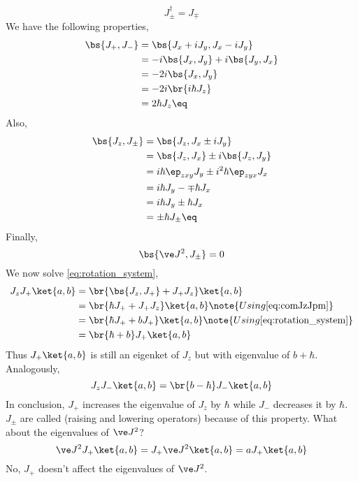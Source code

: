 \documentclass{article}
\begin{document}
\[ J_{\pm}^{\dagger} = J_{\mp} \]
We have the following properties,
\begin{align*}
    \bs{J_+, J_-}
    &= \bs{J_x + i J_y, J_x - i J_y} \\
    &= -i\bs{J_x, J_y} +i\bs{J_y, J_x} \\
    &= -2i\bs{J_x, J_y} \\
    &= -2i\br{i \hbar J_z} \\
    &= 2\hbar J_z \eq \label{eq:comJpJm}
\end{align*}
Also,
\begin{align*}
    \bs{J_z, J_{\pm}}
    &= \bs{J_z, J_x \pm i J_y} \\
    &= \bs{J_z, J_x} \pm i \bs{J_z, J_y} \\
    &= i \hbar \ep_{zxy} J_y \pm i^2 \hbar \ep_{zyx} J_x \\
    &= i \hbar J_y - \mp \hbar J_x \\
    &= i \hbar J_y \pm \hbar J_x \\
    &= \pm \hbar J_{\pm} \eq \label{eq:comJzJpm}
\end{align*}
Finally,
\[ \bs{\ve J^2, J_{\pm}} = 0 \]
We now solve \cref{eq:rotation_system},
\begin{align*}
    J_z J_+ \ket{a,b}
    &= \br{\bs{J_z, J_+} + J_+ J_z} \ket{a,b} \\
    &= \br{\hbar J_+ + J_+ J_z} \ket{a,b} \note{Using \cref{eq:comJzJpm}}\\
    &= \br{\hbar J_+ + b J_+} \ket{a,b} \note{Using \cref{eq:rotation_system}}\\
    &= \br{\hbar + b }J_+ \ket{a,b}
\end{align*}
Thus $J_+ \ket{a,b}$ is still an eigenket of $J_z$ but with eigenvalue of $b+\hbar$. Analogously,
\[ J_z J_- \ket{a,b} = \br{b - \hbar} J_- \ket{a,b} \]
In conclusion, $J_+$ increases the eigenvalue of $J_z$ by $\hbar$ while $J_-$ decreases it by $\hbar$. $J_{\pm}$ are called  (raising and lowering operators) because of this property. What about the eigenvalues of $\ve J^2$?
\[ \ve J^2 J_+ \ket{a,b} = J_+ \ve J^2 \ket{a,b} = a J_+\ket{a,b} \]
No, $J_+$ doesn't affect the eigenvalues of $\ve J^2$.\\
\end{document}
